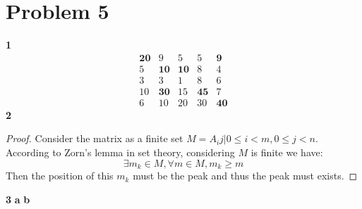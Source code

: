 \documentclass{article}
\begin{document}
\section*{Problem 5}
\textbf{1}
  \[
  \begin{matrix}
    \textbf{20} & 9 & 5 & 5 & \textbf{9} \\
    5 & \textbf{10} & \textbf{10} & 8 & 4 \\
    3 & 3 & 1 & 8 & 6 \\
    10 & \textbf{30} & 15 & \textbf{45} & 7 \\
    6 & 10 & 20 & 30 & \textbf{40}
  \end{matrix}
  \]
\textbf{2}
  \begin{proof}
    Consider the matrix as a finite set $M = {A_ij | 0\leq i < m, 0 \leq j < n}$. 
    According to Zorn's lemma in set theory, considering $M$ is finite we have:
    $$\exists m_k \in M, \forall m \in M, m_k \geq m$$
    Then the position of this $m_k$ must be the peak and thus the peak must exists.
  \end{proof}

\textbf{3}
  \textbf{a}
  \textbf{b}
\end{document}
